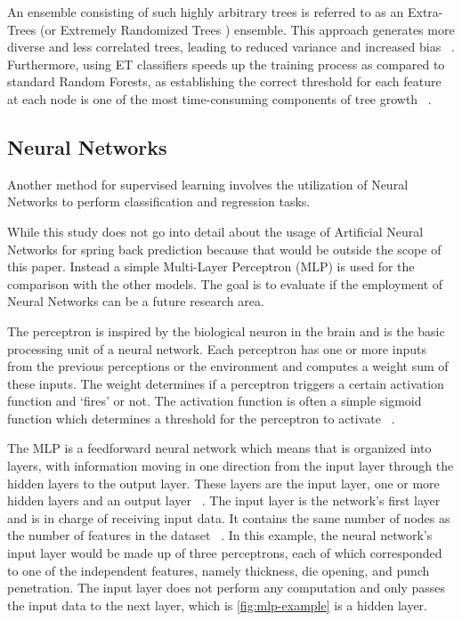 An ensemble consisting of such highly arbitrary trees is referred to as an Extra-Trees (or Extremely Randomized Trees
) ensemble.
This approach generates more diverse and less correlated trees, leading to reduced variance and increased
bias
~\cite[p. 351]{geron2022hands}.
Furthermore, using ET classifiers speeds up the training process as compared to standard Random Forests, as
establishing the correct threshold for each feature at each node is one of the most time-consuming components of tree
growth
~\cite[p. 351]{geron2022hands}.

\subsection{Neural Networks}\label{subsec:neural-networks}
Another method for supervised learning involves the utilization of Neural Networks to
perform classification and regression tasks.

While this study does not go into detail about the usage of Artificial Neural Networks for spring back prediction
because that would be outside the scope of this paper.
Instead a simple Multi-Layer Perceptron (MLP) is used for the comparison with the other models.
The goal is to evaluate if the employment of Neural Networks can be a future research area.

The perceptron is inspired by the biological neuron in the brain and is the basic processing unit of a neural
network.
Each perceptron has one or more inputs from the previous perceptions or the environment and computes a weight sum of
these inputs.
The weight determines if a perceptron triggers a certain activation function and `fires' or
not.
The activation function is often a simple sigmoid function which determines a threshold for the perceptron to activate
~\cite[pp. 271--273]{alpaydin2020introduction}.

The MLP is a feedforward neural network which means that is organized into layers, with information
moving in one direction from the input layer through the hidden layers to the output
layer.
These layers are the input layer, one or more hidden layers and an output
layer
~\cite[pp. 279--280]{bishop1995neural}.
The input layer is the network's first layer and is in charge of receiving input data.
It contains the same number of nodes as the number of features in the dataset
~\cite[p. 105]{muller2016introduction}.
In this example, the neural network's input layer would be made up of three perceptrons, each of which corresponded
to one of the independent features, namely thickness, die opening, and punch penetration.
The input layer does not perform any computation and only passes the input data to the next layer, which is
\cref{fig:mlp-example} is a hidden layer.

